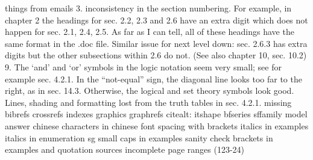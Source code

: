 things from emails
  3. inconsistency in the section numbering. For example, in chapter 2 the headings for sec. 2.2, 2.3 and 2.6 have an extra digit which does not happen for sec. 2.1, 2.4, 2.5.  As far as I can tell, all of these headings have the same format in the .doc file. Similar issue for next level down: sec. 2.6.3 has extra digits but the other subsections within 2.6 do not.  (See also chapter 10, sec. 10.2)
  9. The ‘and’ and ‘or’ symbols in the logic notation seem very small; see for example sec. 4.2.1. In the “not-equal” sign, the diagonal line looks too far to the right, as in sec. 14.3.  Otherwise, the logical and set theory symbols look good.
  Lines, shading and formatting lost from the truth tables in sec. 4.2.1.
missing bibrefs
crossrefs 
indexes
graphics 
graphrefs
citealt:
itshape
bfseries
sffamily model answer 
chinese characters in chinese font
spacing with brackets
italics in examples
italics in enumeration
sg small caps in examples
sanity check 
brackets in examples and quotation sources
incomplete page ranges (123-24)
